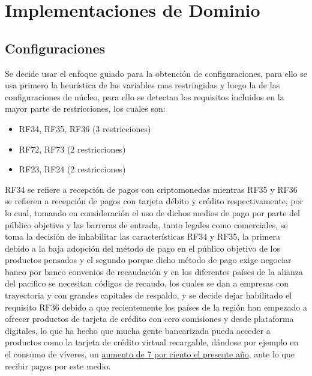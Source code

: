 \documentclass[letterpaper]{article}
\begin{document}



\section{Implementaciones de Dominio}

\subsection{Configuraciones}

Se decide usar el enfoque guiado para la obtención de configuraciones, para ello se usa primero la heurística de las variables mas restringidas y luego la de las configuraciones de núcleo, para ello se detectan los requisitos incluidos en la mayor parte de restricciones, los cuales son:

\begin{itemize}
    \item RF34, RF35, RF36 (3 restricciones)
    \item RF72, RF73 (2 restricciones)
    \item RF23, RF24 (2 restricciones)
\end{itemize}

RF34 se refiere a recepción de pagos con criptomonedas mientras RF35 y RF36 se refieren a recepción de pagos con tarjeta débito y crédito respectivamente, por lo cual, tomando en consideración el uso de dichos medios de pago por parte del público objetivo y las barreras de entrada, tanto legales como comerciales, se toma la decisión de inhabilitar las características RF34 y RF35, la primera debido a la baja adopción del método de pago en el público objetivo de los productos pensados y el segundo porque dicho método de pago exige negociar banco por banco convenios de recaudación y en los diferentes países de la alianza del pacifico se necesitan códigos de recaudo, los cuales se dan a empresas con trayectoria y con grandes capitales de respaldo, y se decide dejar habilitado el requisito RF36 debido a que recientemente los países de la región han empezado a ofrecer productos de tarjeta de crédito con cero comisiones y desde plataforma digitales, lo que ha hecho que mucha gente bancarizada pueda acceder a productos como la tarjeta de crédito virtual recargable, dándose por ejemplo en el consumo de víveres, un \href{https://www.dinero.com/empresas/articulo/crecimiento-del-comercio-electronico-en-colombia-durante-la-pandemia/302658}{aumento de 7 por ciento el presente año}, ante lo que recibir pagos por este medio.
\end{document}
